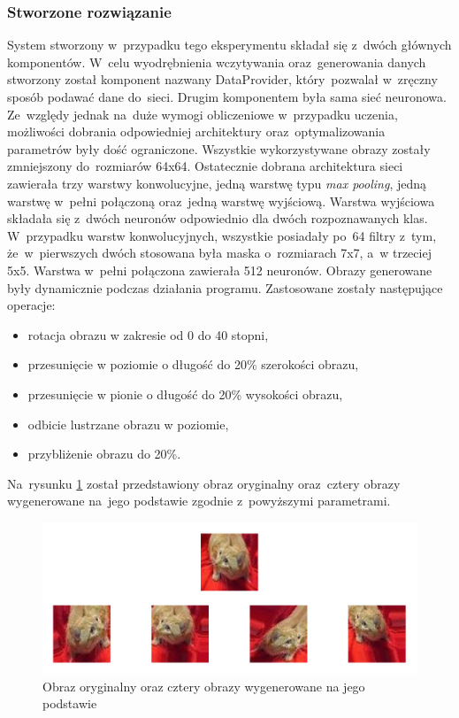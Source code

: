\subsubsection{Stworzone rozwiązanie}
System stworzony w~przypadku tego eksperymentu składał się z~dwóch głównych komponentów. W~celu wyodrębnienia wczytywania oraz~generowania danych stworzony został komponent nazwany DataProvider, który~pozwalał w~zręczny sposób podawać dane do~sieci. Drugim komponentem była sama sieć neuronowa. Ze~względy jednak na~duże wymogi obliczeniowe w~przypadku uczenia, możliwości dobrania odpowiedniej architektury oraz~optymalizowania parametrów były dość ograniczone. Wszystkie wykorzystywane obrazy zostały zmniejszony do~rozmiarów 64x64. Ostatecznie dobrana architektura sieci zawierała trzy warstwy konwolucyjne, jedną warstwę typu \textit{max pooling}, jedną warstwę w~pełni połączoną  oraz~jedną warstwę wyjściową. Warstwa wyjściowa składała się z~dwóch neuronów odpowiednio dla dwóch rozpoznawanych klas. W~przypadku warstw konwolucyjnych, wszystkie posiadały po~64 filtry z~tym, że~w~pierwszych dwóch stosowana była maska o~rozmiarach 7x7, a~w trzeciej 5x5.  Warstwa w~pełni połączona zawierała 512 neuronów. Obrazy generowane były dynamicznie podczas działania programu. Zastosowane zostały następujące operacje:
\begin{itemize}
\item rotacja obrazu w zakresie od 0 do 40 stopni,
\item przesunięcie w poziomie o długość do 20\% szerokości obrazu,
\item przesunięcie w pionie o długość do 20\% wysokości obrazu,
\item odbicie lustrzane obrazu w poziomie,
\item przybliżenie obrazu do 20\%.
\end{itemize}
Na~rysunku \ref{catdogsimages} został przedstawiony obraz oryginalny oraz~cztery obrazy wygenerowane na~jego podstawie zgodnie z~powyższymi parametrami.

\begin{figure}[ht!]
\centering
\includegraphics[scale=0.4]{res/catdogsaug.png}
\caption[Caption for LOF]{Obraz oryginalny oraz cztery obrazy wygenerowane na jego podstawie \label{catdogsimages}}
\end{figure} 

